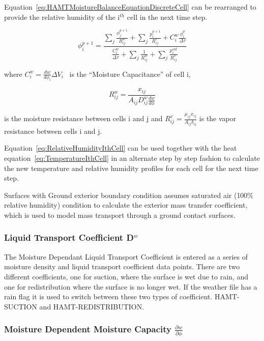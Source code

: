 Equation~\ref{eq:HAMTMoistureBalanceEquationDiscreteCell} can be rearranged
to provide the relative humidity of the i\(^{th}\) cell in the next time
step.

\begin{equation}
\phi_i^{p + 1} = \frac{{\sum\nolimits_j {\frac{{\phi_j^{p + 1}}}{{R_{ij}^w}}}  + \sum\nolimits_j {\frac{{p_i^{p + 1}}}{{R_{ij}^v}}}  + C_i^w\frac{{\phi_i^p}}{{\Delta \tau }}}}{{\frac{{C_i^w}}{{\Delta \tau }} + \sum\nolimits_j {\frac{1}{{R_{ij}^w}} + \sum\nolimits_j {\frac{{p_i^{sat}}}{{R_{ij}^v}}} } }}
\label{eq:RelativeHumidityIthCell}
\end{equation}

where \(C_i^w = \frac{dw}{d\phi_{i}}\Delta {V_i}\) ~is the ``Moisture
Capacitance'' of cell i,

\begin{equation}
R_{ij}^w = \frac{{{x_{ij}}}}{{{A_{ij}}D_{ij}^w\frac{{dw}}{{d\phi }}}}
\end{equation}

is the moisture resistance between cells i and j and
\(R_{ij}^v = \frac{\mu_{ij}x_{ij}}{A_{ij}\delta_{ij}}\) is the vapor
resistance between cells i and j.

Equation~\ref{eq:RelativeHumidityIthCell} can be used together with the
heat equation~\ref{eq:TemperatureIthCell} in an alternate step by step
fashion to calculate the new temperature and relative humidity profiles
for each cell for the next time step.

Surfaces with Ground exterior boundary condition assumes saturated air
({100\%} relative humidity) condition to calculate the exterior mass
transfer coefficient, which is used to model mass transport through a
ground contact surfaces.

\subsubsection{Liquid Transport Coefficient D\(^{w}\)}\label{liquid-transport-coefficient-dw}

The Moisture Dependant Liquid Transport Coefficient is entered as a series
of moisture density and liquid transport coefficient data points. There are
two different coefficients, one for suction, where the surface is wet due
to rain, and one for redistribution where the surface is no longer wet. If
the weather file has a rain flag it is used to switch between these two
types of coefficient. HAMT-SUCTION and HAMT-REDISTRIBUTION.

\subsubsection{Moisture Dependent Moisture Capacity \(\frac{\partial w}{\partial \phi}\)}\label{moisture-dependent-moisture-capacity-fracpartial-wpartial-phi}


